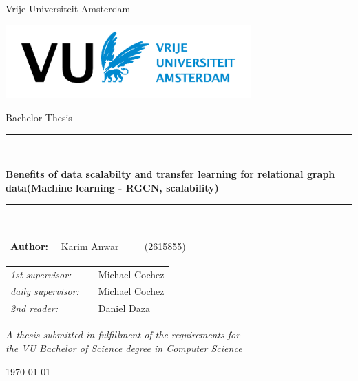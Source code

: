 \documentclass[11pt]{article}
\begin{document}
\thispagestyle{empty}


\begin{center}

Vrije Universiteit Amsterdam

\vspace{1mm}

\includegraphics[height=28mm]{VUlogo_NL_Wit_HR_RGB_tcm289-201376.png}

\vspace{1.5cm}

{\Large Bachelor Thesis}

\vspace*{1.5cm}

\rule{.9\linewidth}{.6pt}\\[0.4cm]
{\huge \bfseries Benefits of data scalabilty and transfer learning for relational graph data\linebreak (Machine learning - RGCN, scalability)\par}
\vspace{0.4cm}
\rule{.9\linewidth}{.6pt}\\[1.5cm]

\vspace*{2mm}

{\Large
\begin{tabular}{l}
{\bf Author:} ~~Karim Anwar ~~~~ (2615855)
\end{tabular}
}

\vspace*{1.5cm}

\begin{tabular}{ll}
{\it 1st supervisor:}   & ~~Michael Cochez \\
{\it daily supervisor:} & ~~Michael Cochez \\
{\it 2nd reader:}       & ~~Daniel Daza
\end{tabular}



\vspace*{2cm}

\textit{A thesis submitted in fulfillment of the requirements for\\ the VU Bachelor of Science degree in Computer Science }

\vspace*{1cm}

\today\\[4cm] %

\end{center}
\end{document}
